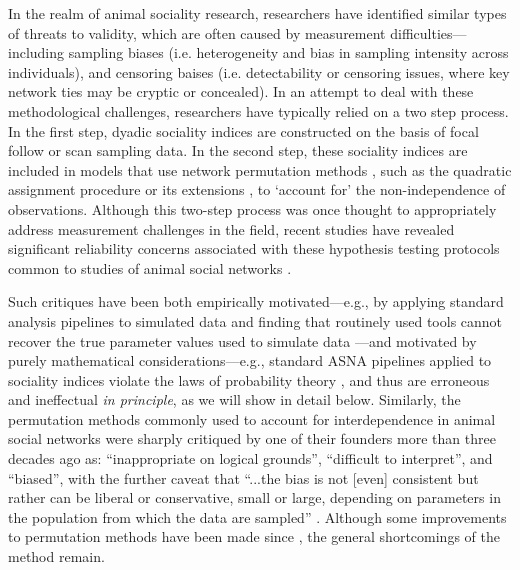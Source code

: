 \documentclass[Afour,sageh,times]{sagej}
\begin{document}
In the realm of animal sociality research, researchers have identified similar types of threats to validity, which are often caused by measurement difficulties---including sampling biases (i.e. heterogeneity and bias in sampling intensity across individuals), and censoring baises (i.e. detectability or censoring issues, where key network ties may be cryptic or concealed). In an attempt to deal with these methodological challenges, researchers have typically relied on a two step process. In the first step, dyadic sociality indices \citep{Whitehead1999} are constructed on the basis of focal follow or scan sampling data. In the second step, these sociality indices are included in models that use network permutation methods \citep{Farine2013, Farine2015a}, such as the quadratic assignment procedure \citep[i.e., QAP;][]{hubert1976quadratic, krackardt1987qap} or its extensions \citep[e.g., MRQAP;][]{dekker2003multicollinearity}, to `account for' the non-independence of observations. 
Although this two-step process was once thought to appropriately address measurement challenges in the field, recent studies have revealed significant reliability concerns associated with these hypothesis testing protocols common to studies of animal social networks \citep{weiss2021common, Puga2021, Hart2022, Farine2022}. 

Such critiques have been both empirically motivated---e.g., by applying standard analysis pipelines to simulated data and finding that routinely used tools cannot recover the true parameter values used to simulate data \citep{Puga2021}---and motivated by purely mathematical considerations---e.g., standard ASNA pipelines applied to sociality indices violate the laws of probability theory \citep{jaynes2003probability}, and thus are erroneous and ineffectual \emph{in principle}, as we will show in detail below. Similarly, the permutation methods commonly used to account for interdependence in animal social networks were sharply critiqued by one of their founders more than three decades ago as: ``inappropriate on logical grounds'', ``difficult to interpret'', and ``biased'', with the further caveat that ``...the bias is not [even] consistent but rather can be liberal or conservative, small or large, depending on parameters in the population from which the data are sampled'' \citep[][p. 1]{krackhardt1992caveat}. Although some improvements to permutation methods have been made since \citep[][]{dekker2003multicollinearity, hunter2008ergm},  the general shortcomings of the method remain.
\end{document}
